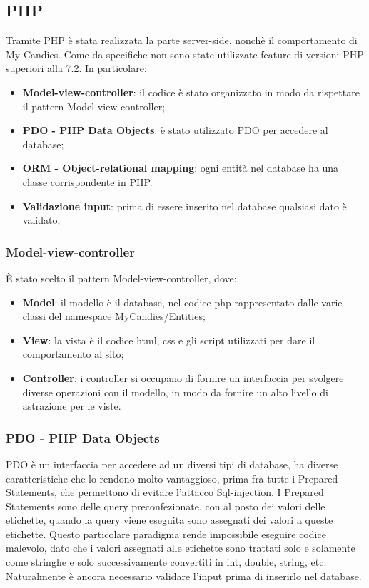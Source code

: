 \subsection{PHP}
Tramite PHP è stata realizzata la parte server-side, nonchè il comportamento di My Candies. Come da specifiche non sono state utilizzate feature di versioni PHP superiori alla 7.2.
In particolare:
\begin{itemize}
    \item \textbf{Model-view-controller}: il codice è stato organizzato in modo da rispettare il pattern Model-view-controller;
    \item \textbf{PDO - PHP Data Objects}: è stato utilizzato PDO per accedere al database;
    \item \textbf{ORM - Object-relational mapping}: ogni entità nel database ha una classe corrispondente in PHP.
    \item \textbf{Validazione input}: prima di essere inserito nel database qualsiasi dato è validato;
\end{itemize}

\subsubsection{Model-view-controller}
È stato scelto il pattern Model-view-controller, dove:
\begin{itemize}
    \item \textbf{Model}: il modello è il database, nel codice php rappresentato dalle varie classi del namespace MyCandies/Entities;
    \item \textbf{View}: la vista è il codice html, css e gli script utilizzati per dare il comportamento al sito;
     \item \textbf{Controller}: i controller si occupano di fornire un interfaccia per svolgere diverse operazioni con il modello, in modo da fornire un alto livello di astrazione per le viste.
\end{itemize}
\subsubsection{PDO - PHP Data Objects}
PDO è un interfaccia per accedere ad un diversi tipi di database, ha diverse caratteristiche che lo rendono molto vantaggioso, prima fra tutte i Prepared Statements, che permettono di evitare l'attacco Sql-injection.
I Prepared Statements sono delle query preconfezionate, con al posto dei valori delle etichette, quando la query viene eseguita sono assegnati dei valori a queste etichette. Questo particolare paradigma rende impossibile eseguire codice malevolo, dato che i valori assegnati alle etichette sono trattati solo e solamente come stringhe e solo successivamente convertiti in int, double, string, etc. Naturalmente è ancora necessario validare l'input prima di inserirlo nel database.
